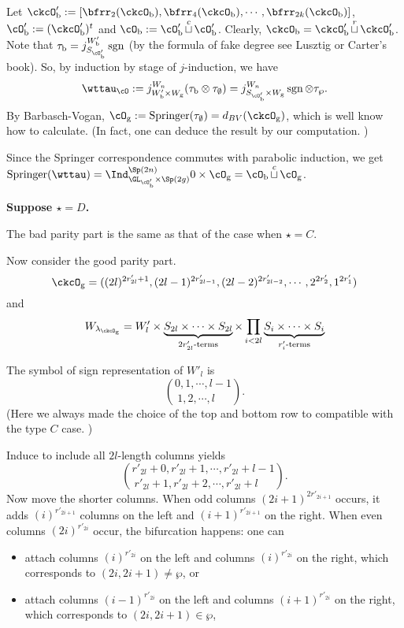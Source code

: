 \documentclass[12pt]{amsart}
\newcommand{\sgn}{\operatorname{sgn}}
\numberwithin{equation}{section}
\theoremstyle{remark}
\def\lamckg{\lambda_{\ckcO_{\mathrm g}}}
\def\cuprow{{\stackrel{r}{\sqcup}}}
\def\cupcol{{\stackrel{c}{\sqcup}}}
\def\Spr{\mathrm{Springer}}
\def\cuprow{{\,\stackrel{r}{\sqcup}\,}}
\def\cupcol{{\,\stackrel{c}{\sqcup}\,}}
\begin{document}
{{      Let
      $\ckcO'_{\mathrm b}: = [\bfrr_{2}(\ckcO_{\mathrm b}), \bfrr_{4}(\ckcO_{\mathrm b}),\cdots, \bfrr_{2k}(\ckcO_{\mathrm b})]$,
      $\cO'_{\mathrm b}:=(\ckcO'_{\mathrm b})^{t}$ and $\cO_{\mathrm b}:=\cO'_{\mathrm b}\cupcol \cO'_{\mathrm b}$.
      Clearly, $\ckcO_{\mathrm b} = \ckcO'_{\mathrm b}\cuprow \ckcO'_{\mathrm b}$. Note that
      $\tau_{\mathrm b} = j_{S_{\cO'_{\mathrm b}}}^{W'_{\mathrm b}} \sgn$ (by the formula of fake degree
      see Lusztig or Carter's book). So, by induction by stage of $j$-induction,
      we have
      \[
        \wttau_{\cO}:= j_{W'_{\mathrm b}\times W_{\mathrm g}}^{W_{n}} (\tau_{\mathrm b}\otimes \tau_{\emptyset}) = j_{S_{\cO'_{\mathrm b}}\times W_{\mathrm g}}^{W_{n}} \sgn\otimes \tau_{\wp}.
      \]
      By Barbasch-Vogan, $\cO_{\mathrm g}:=\Spr(\tau_{\emptyset}) = d_{BV}(\ckcO_{\mathrm g})$,
      which is well know how to calculate. (In fact, one can deduce the result
      by our computation. )

      Since the Springer correspondence commutes with parabolic induction, we
      get
      $\Spr(\wttau) = \Ind_{\GL_{\cO'_{\mathrm b}}\times \Sp(2g)}^{\Sp(2n)} 0\times \cO_{\mathrm g} = \cO_{\mathrm b}\cupcol \cO_{\mathrm g}$.


      \medskip

      {\bf Suppose $\star=D$.}

      The bad parity part is the same as that of the case when $\star = C$.

      Now consider the good parity part.
      \[
        \ckcO_{\mathrm g} = ((2l)^{2r'_{2l}+1}, (2l-1)^{2r'_{2l-1}}, (2l-2)^{2r'_{2l-2}}, \cdots, 2^{2r'_{2}}, 1^{2r'_{1}} )
      \]
      and
      \[
        W_{\lamckg} = W'_{l}\times \underbrace{S_{2l}\times \cdots \times S_{2l}}_{2r'_{2l}\text{-terms}} \times \prod_{i<2l} \underbrace{S_{i}\times \cdots\times S_{i}}_{r'_{i}\text{-terms}}
      \]

      The symbol of sign representation of $W'_{l}$ is
      \[
        \binom{0,1, \cdots, l-1}{1,2, \cdots, l\phantom{-1}}.
      \]
      (Here we always made the choice of the top and bottom row to compatible
      with the type $C$ case. )

      Induce to include all $2l$-length columns yields
      \[
        \binom{r'_{2l}+0,r'_{2l}+1, \cdots, r'_{2l}+l-1}{ r'_{2l}+1,r'_{2l}+2, \cdots, r'_{2l}+l\phantom{-1}}.
      \]
      Now move the shorter columns. When odd columns $(2i+1)^{2r'_{2i+1}}$
      occurs, it adds $(i)^{r'_{2i+1}}$ columns on the left and
      $(i+1)^{r'_{2i+1}}$ on the right. When even columns $(2i)^{r'_{2i}}$
      occur, the bifurcation happens: one can
      \begin{itemize}
        \item attach columns $(i)^{r'_{2i}}$ on the left and columns
              $(i)^{r'_{2i}}$ on the right, which corresponds to
              $(2i,2i+1)\neq \wp$, or
        \item attach columns $(i-1)^{r'_{2i}}$ on the left and columns
              $(i+1)^{r'_{2i}}$ on the right, which corresponds to
              $(2i,2i+ 1)\in \wp$,
      \end{itemize}

}}
\end{document}
